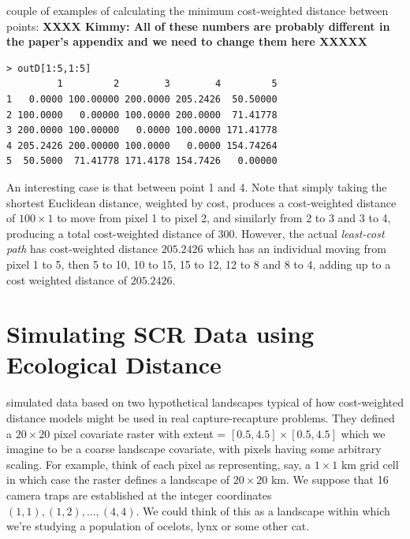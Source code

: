 couple of examples of calculating the minimum cost-weighted distance
between points: {\bf XXXX Kimmy: All of these numbers are probably
  different
in the paper's appendix and we need to change them here XXXXX}
\begin{center}
{\small
\begin{verbatim}
> outD[1:5,1:5]
         1         2        3        4         5
1   0.0000 100.00000 200.0000 205.2426  50.50000
2 100.0000   0.00000 100.0000 200.0000  71.41778
3 200.0000 100.00000   0.0000 100.0000 171.41778
4 205.2426 200.00000 100.0000   0.0000 154.74264
5  50.5000  71.41778 171.4178 154.7426   0.00000
\end{verbatim}
}
\end{center}
An interesting case is that between point 1 and 4. Note that simply
taking the shortest Euclidean distance, weighted by cost, produces a
cost-weighted distance of $100 \times 1$ to move from pixel 1 to pixel
2, and similarly from 2 to 3 and 3 to 4, producing a total
cost-weighted distance of $300$. However, the actual {\it least-cost
  path} has cost-weighted distance $205.2426$ which
 has an individual moving from pixel 1 to 5, then 5
to 10, 10 to 15, 15 to 12, 12 to 8 and 8 to 4, adding up to a cost
weighted distance of
$205.2426$.


\section{Simulating SCR Data using Ecological Distance}
\label{ecoldist.sec.simulating}

\citet{royle_etal:2012ecol} simulated data based on two hypothetical
landscapes typical of how
cost-weighted distance models might be used in real capture-recapture
problems.  They defined a $20 \times 20$ pixel covariate raster with
extent = $[0.5, 4.5] \times [0.5, 4.5]$ which we imagine to be a
 coarse landscape covariate, with pixels
having some arbitrary scaling. For example, think of each pixel as
representing, say, a $1 \times 1$ km grid cell in which case
the raster defines a landscape of $20 \times 20$ km. We suppose
that 16 camera traps are established at the integer coordinates
$(1,1), (1,2), \ldots, (4,4)$. We could think of this as a landscape
within which we're studying a population of ocelots, lynx or some
other cat.

